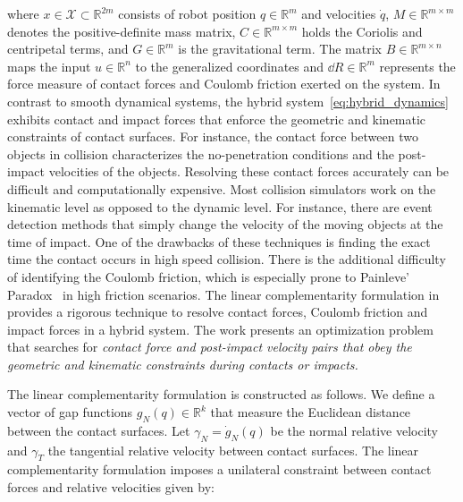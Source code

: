 \noindent where $x \in \mathcal{X} \subset \mathbb{R}^{2m}$ consists of robot
position $q \in \mathbb{R}^m$ and velocities $\dot{q}$, $M \in \mathbb{R}^{m
\times m}$ denotes the positive-definite mass matrix, $C \in \mathbb{R}^{m
\times m}$ holds the Coriolis and centripetal terms, and $G \in \mathbb{R}^{m}$
is the gravitational term. The matrix $B \in \mathbb{R}^{m \times n}$ maps the
input $u \in \mathbb{R}^{n}$ to the generalized coordinates and $\dd R \in
\mathbb{R}^m$ represents the force measure of contact forces and Coulomb
friction exerted on the system. 
%
%
In contrast to smooth dynamical systems, the hybrid
system~\eqref{eq:hybrid_dynamics} exhibits contact and impact forces that enforce
the geometric and kinematic constraints of contact surfaces.
%
For instance, the contact force between two objects in collision characterizes
the no-penetration conditions and the post-impact velocities of the objects.
%
Resolving these contact forces accurately can be difficult and computationally
expensive.
%
Most collision simulators work on the kinematic level as opposed to the dynamic
level.
%
For instance, there are event detection methods that simply change the velocity
of the moving objects at the time of impact.
%
One of the drawbacks of these techniques is finding the exact time the contact
occurs in high speed collision.
%
There is the additional difficulty of identifying the Coulomb friction, which is
especially prone to Painleve' Paradox~\cite{genot1999new} in high friction
scenarios.
%
The linear complementarity formulation in~\cite{glocker2005formulation} provides
a rigorous technique to resolve contact forces, Coulomb friction and impact
forces in a hybrid system.
%
The work presents an optimization problem that searches for \it{contact force
and post-impact velocity} \normalfont pairs that obey the geometric and
kinematic constraints during contacts or impacts.
%

%
The linear complementarity formulation is constructed as follows. We define a
vector of gap functions $g_N(q) \in \mathbb{R}^{k}$ that measure the
Euclidean distance between the contact surfaces. 
%
Let $\gamma_N = \dot{g}_N(q)$ be the normal relative velocity and
$\gamma_T$ the tangential relative velocity between contact surfaces.
%
The linear complementarity formulation imposes a unilateral constraint between
contact forces and relative velocities given by:

